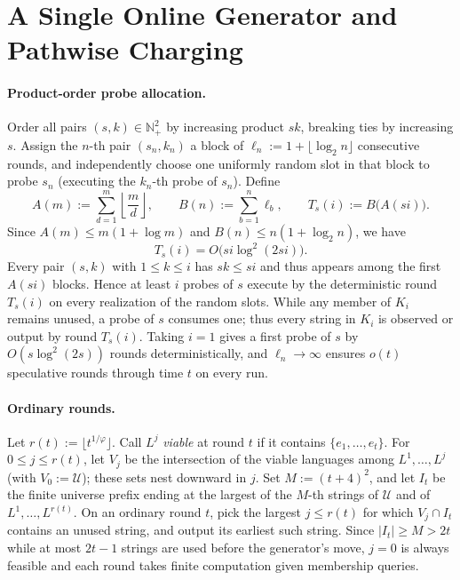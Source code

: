 \documentclass[11pt]{article}
\theoremstyle{plain}
\theoremstyle{definition}
\theoremstyle{remark}
\begin{document}
\section{A Single Online Generator and Pathwise Charging}

\paragraph{Product-order probe allocation.}
Order all pairs $(s, k) \in \mathbb{N}_+^2$ by increasing product $sk$, breaking ties by increasing $s$.
Assign the $n$-th pair $(s_n, k_n)$ a block of $\ell_n := 1 + \lfloor \log_2 n \rfloor$ consecutive rounds, and independently choose one uniformly random slot in that block to probe $s_n$ (executing the $k_n$-th probe of $s_n$).
Define
\[
A(m) := \sum_{d=1}^m \left\lfloor \frac{m}{d} \right\rfloor,
\qquad
B(n) := \sum_{b=1}^n \ell_b,
\qquad
T_s(i) := B\bigl(A(si)\bigr).
\]
Since $A(m) \le m(1 + \log m)$ and $B(n) \le n(1 + \log_2 n)$, we have
\[
T_s(i) = O\bigl(si \log^2(2si)\bigr).
\]
Every pair $(s, k)$ with $1 \le k \le i$ has $sk \le si$ and thus appears among the first $A(si)$ blocks.
Hence at least $i$ probes of $s$ execute by the deterministic round $T_s(i)$ on every realization of the random slots.
While any member of $K_i$ remains unused, a probe of $s$ consumes one; thus every string in $K_i$ is observed or output by round $T_s(i)$.
Taking $i = 1$ gives a first probe of $s$ by $O(s \log^2(2s))$ rounds deterministically, and $\ell_n \to \infty$ ensures $o(t)$ speculative rounds through time $t$ on every run.

\paragraph{Ordinary rounds.}
Let $r(t) := \lfloor t^{1/\varphi} \rfloor$.
Call $L^j$ \emph{viable} at round $t$ if it contains $\{e_1, \dots, e_t\}$.
For $0 \le j \le r(t)$, let $V_j$ be the intersection of the viable languages among $L^1, \dots, L^j$ (with $V_0 := \mathcal{U}$); these sets nest downward in $j$.
Set $M := (t + 4)^2$, and let $I_t$ be the finite universe prefix ending at the largest of the $M$-th strings of $\mathcal{U}$ and of $L^1, \dots, L^{r(t)}$.
On an ordinary round $t$, pick the largest $j \le r(t)$ for which $V_j \cap I_t$ contains an unused string, and output its earliest such string.
Since $|I_t| \ge M > 2t$ while at most $2t - 1$ strings are used before the generator's move, $j = 0$ is always feasible and each round takes finite computation given membership queries.
\end{document}
